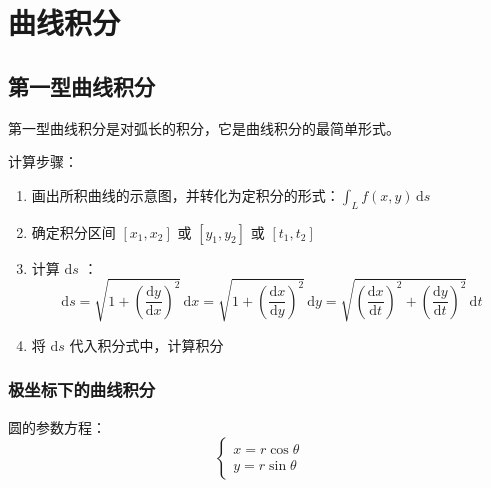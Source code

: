\chapter{曲线积分}

\section{第一型曲线积分}

第一型曲线积分是对弧长的积分，它是曲线积分的最简单形式。

计算步骤：

\begin{enumerate}
    \item 画出所积曲线的示意图，并转化为定积分的形式：$\int_{L} f(x,y) \, \mathrm{d}s$
    \item 确定积分区间 $[x_1,x_2]$ 或 $[y_1,y_2]$ 或 $[t_1,t_2]$
    \item 计算 $\mathrm{d}s$ ：
          \[
              \mathrm{d}s = \sqrt{1+(\frac{\mathrm{d}y}{\mathrm{d}x})^2} \, \mathrm{d}x = \sqrt{1+(\frac{\mathrm{d}x}{\mathrm{d}y})^2} \, \mathrm{d}y = \sqrt{(\frac{\mathrm{d}x}{\mathrm{d}t})^2+(\frac{\mathrm{d}y}{\mathrm{d}t})^2} \, \mathrm{d}t
          \]
    \item 将 $\mathrm{d}s$ 代入积分式中，计算积分
\end{enumerate}

\subsection{极坐标下的曲线积分}

圆的参数方程：
\[
    \begin{cases}
        x = r \cos \theta \\
        y = r \sin \theta
    \end{cases}
\]